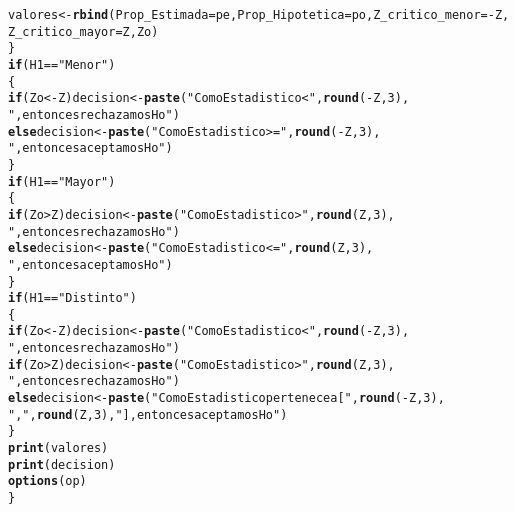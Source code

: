 \documentclass{article}\usepackage[]{graphicx}\usepackage[]{color}
\makeatletter
\newcommand{\hlnum}[1]{\textcolor[rgb]{0.686,0.059,0.569}{#1}}%
\newcommand{\hlstr}[1]{\textcolor[rgb]{0.192,0.494,0.8}{#1}}%
\newcommand{\hlopt}[1]{\textcolor[rgb]{0,0,0}{#1}}%
\newcommand{\hlstd}[1]{\textcolor[rgb]{0.345,0.345,0.345}{#1}}%
\newcommand{\hlkwa}[1]{\textcolor[rgb]{0.161,0.373,0.58}{\textbf{#1}}}%
\newcommand{\hlkwb}[1]{\textcolor[rgb]{0.69,0.353,0.396}{#1}}%
\newcommand{\hlkwc}[1]{\textcolor[rgb]{0.333,0.667,0.333}{#1}}%
\newcommand{\hlkwd}[1]{\textcolor[rgb]{0.737,0.353,0.396}{\textbf{#1}}}%
\newenvironment{kframe}{%
 \def\at@end@of@kframe{}%
 \ifinner\ifhmode%
  \def\at@end@of@kframe{\end{minipage}}%
  \begin{minipage}{\columnwidth}%
 \fi\fi%
 \def\FrameCommand##1{\hskip\@totalleftmargin \hskip-\fboxsep
 \colorbox{shadecolor}{##1}\hskip-\fboxsep
     \hskip-\linewidth \hskip-\@totalleftmargin \hskip\columnwidth}%
 \MakeFramed {\advance\hsize-\width
   \@totalleftmargin\z@ \linewidth\hsize
   \@setminipage}}%
 {\par\unskip\endMakeFramed%
 \at@end@of@kframe}
\newenvironment{knitrout}{}{} %
\makeatother
\begin{document}
\begin{knitrout}
\begin{kframe}
\begin{alltt}
    \hlstd{valores} \hlkwb{<-} \hlkwd{rbind}\hlstd{(}\hlkwc{Prop_Estimada}\hlstd{=pe,} \hlkwc{Prop_Hipotetica} \hlstd{=po,} \hlkwc{Z_critico_menor}\hlstd{=}\hlopt{-}\hlstd{Z,}
                     \hlkwc{Z_critico_mayor} \hlstd{=Z, Zo)}
  \hlstd{\}}
  \hlkwa{if} \hlstd{(H1} \hlopt{==} \hlstr{"Menor"}\hlstd{)}
  \hlstd{\{}
    \hlkwa{if} \hlstd{(Zo} \hlopt{< -}\hlstd{Z) decision} \hlkwb{<-} \hlkwd{paste}\hlstd{(}\hlstr{"Como Estadistico <"}\hlstd{,} \hlkwd{round}\hlstd{(}\hlopt{-}\hlstd{Z,}\hlnum{3}\hlstd{),}
                                   \hlstr{", entonces rechazamos Ho"}\hlstd{)}
    \hlkwa{else} \hlstd{decision} \hlkwb{<-} \hlkwd{paste}\hlstd{(}\hlstr{"Como Estadistico>="}\hlstd{,} \hlkwd{round}\hlstd{(}\hlopt{-}\hlstd{Z,}\hlnum{3}\hlstd{),}
                           \hlstr{", entonces aceptamos Ho"}\hlstd{)}
  \hlstd{\}}
  \hlkwa{if} \hlstd{(H1} \hlopt{==} \hlstr{"Mayor"}\hlstd{)}
  \hlstd{\{}
    \hlkwa{if} \hlstd{(Zo} \hlopt{>} \hlstd{Z) decision} \hlkwb{<-} \hlkwd{paste}\hlstd{(}\hlstr{"Como Estadistico >"}\hlstd{,} \hlkwd{round}\hlstd{(Z,}\hlnum{3}\hlstd{),}
                                  \hlstr{", entonces rechazamos Ho"}\hlstd{)}
    \hlkwa{else} \hlstd{decision} \hlkwb{<-} \hlkwd{paste}\hlstd{(}\hlstr{"Como Estadistico <="}\hlstd{,} \hlkwd{round}\hlstd{(Z,}\hlnum{3}\hlstd{),}
                           \hlstr{", entonces aceptamos Ho"}\hlstd{)}
  \hlstd{\}}
  \hlkwa{if} \hlstd{(H1} \hlopt{==} \hlstr{"Distinto"}\hlstd{)}
  \hlstd{\{}
    \hlkwa{if} \hlstd{(Zo} \hlopt{< -}\hlstd{Z) decision} \hlkwb{<-} \hlkwd{paste}\hlstd{(}\hlstr{"Como Estadistico <"}\hlstd{,} \hlkwd{round}\hlstd{(}\hlopt{-}\hlstd{Z,}\hlnum{3}\hlstd{),}
                                   \hlstr{", entonces rechazamos Ho"}\hlstd{)}
    \hlkwa{if} \hlstd{(Zo} \hlopt{>} \hlstd{Z) decision} \hlkwb{<-} \hlkwd{paste}\hlstd{(}\hlstr{"Como Estadistico >"}\hlstd{,} \hlkwd{round}\hlstd{(Z,}\hlnum{3}\hlstd{),}
                                  \hlstr{", entonces rechazamos Ho"}\hlstd{)}
    \hlkwa{else} \hlstd{decision} \hlkwb{<-} \hlkwd{paste}\hlstd{(}\hlstr{"Como Estadistico pertenece a ["}\hlstd{,} \hlkwd{round}\hlstd{(}\hlopt{-}\hlstd{Z,}\hlnum{3}\hlstd{),}
\hlstr{","}\hlstd{,} \hlkwd{round}\hlstd{(Z,}\hlnum{3}\hlstd{),} \hlstr{"], entonces aceptamos Ho"}\hlstd{)}
  \hlstd{\}}
  \hlkwd{print}\hlstd{(valores)}
  \hlkwd{print}\hlstd{(decision)}
  \hlkwd{options}\hlstd{(op)}
\hlstd{\}}


\end{alltt}
\end{kframe}
\end{knitrout}
\end{document}
